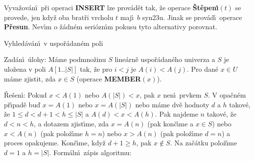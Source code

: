 \flushpar Vyva\v zov\'an\'\i\ p\v ri operaci {\bf INSERT} lze prov\'ad\v et 
tak, \v ze operace {\bf \v St\v epen\'\i$\left(t\right)$} se provede, jen kdy\v z oba 
brat\v ri vrcholu $t$ maj\'\i\ $b$ syn\accent23u. Jinak se prov\'ad\'\i\ 
operace {\bf P\v resun}. Nev\'\i m o \v z\'adn\'em seri\'ozn\'\i m pokusu tyto 
alternativy porovnat.   
\medskip

\heading
Vyhled\'av\'an\'\i\ v uspo\v r\'adan\'em poli
\endheading

\flushpar Zad\'an\'\i\ \'ulohy: M\'ame podmno\v zinu $S$ line\'arn\v e 
uspo\v r\'adan\'eho univerza a $S$ je ulo\v zena v poli 
$A\left[1..|S|\right]$ tak, \v ze pro $i<j$ je $A\left(i\right)<A\left(j\right)$. Pro dan\'e $x\in 
U$ 
m\'ame zjistit, zda $x\in S$ (operace {\bf MEMBER$\left(x\right)$}).
\medskip

\flushpar\v Re\v sen\'\i :  Pokud $x<A\left(1\right)$ nebo $A\left(|S|\right)<x$, pak $
x$ 
nen\'\i\ prvkem $S$.  V opa\v cn\'em p\v r\'\i pad\v e bu\v d $x=
A\left(1\right)$ nebo 
$x=A\left(|S|\right)$ nebo m\'ame dv\v e hodnoty $d$ 
a $h$ takov\'e, \v ze $1\le d<d+1<h\le |S|$ a $A\left(d\right)<x<A\left(h\right)$.  Pak 
najdeme $n$ takov\'e, \v ze $d<n<h$, a dotazem 
zjist\'\i me, zda $x=A\left(n\right)$ (pak kon\v c\'\i me a $x\in S$) nebo 
$x<A\left(n\right)$ (pak polo\v z\'\i me $h=n$) nebo $x>A\left(n\right)$ (pak 
polo\v z\'\i me $d=n$) a proces opakujeme.  Kon\v c\'\i me, kdy\v z 
$d+1\ge h$, pak $x\notin S$. Na za\v c\'atku polo\v z\'\i me $d=1$ a $
h=|S|$.
Form\'aln\'\i\ z\'apis algoritmu:
\bigskip

